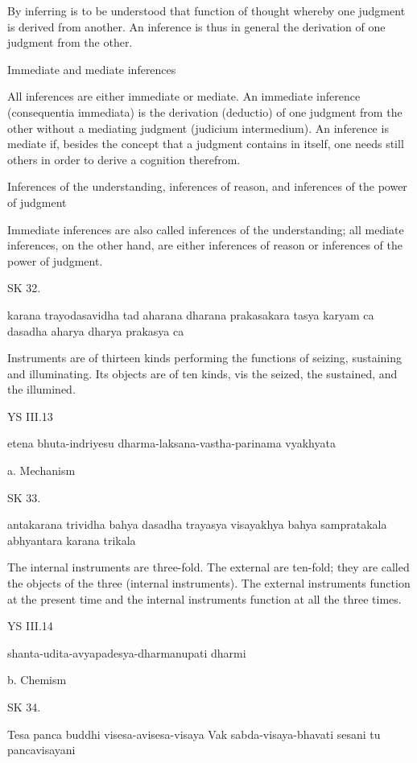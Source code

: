         By inferring is to be understood that function of thought
        whereby one judgment is derived from another.
        An inference is thus in general
        the derivation of one judgment from the other.

    Immediate and mediate inferences

        All inferences are either immediate or mediate.
        An immediate inference (consequentia immediata) is
        the derivation (deductio) of one judgment from the other
        without a mediating judgment (judicium intermedium).
        An inference is mediate if, besides the concept
        that a judgment contains in itself,
        one needs still others in order to
        derive a cognition therefrom.

    Inferences of the understanding, inferences of reason,
    and inferences of the power of judgment

        Immediate inferences are also called
        inferences of the understanding;
        all mediate inferences, on the other hand,
        are either inferences of reason
        or inferences of the power of judgment.

SK 32.

karana trayodasavidha tad aharana dharana prakasakara
tasya karyam ca dasadha aharya dharya prakasya ca

Instruments are of thirteen kinds performing the functions of
seizing, sustaining and illuminating.
Its objects are of ten kinds, vis
the seized, the sustained, and the illumined.

YS III.13

    etena bhuta-indriyesu dharma-laksana-vastha-parinama vyakhyata

    a. Mechanism

SK 33.

antakarana trividha bahya dasadha trayasya visayakhya
bahya sampratakala abhyantara karana trikala

The internal instruments are three-fold.
The external are ten-fold;
they are called the objects of the three (internal instruments).
The external instruments function at the present time and
the internal instruments function at all the three times.

YS III.14

    shanta-udita-avyapadesya-dharmanupati dharmi

    b. Chemism

SK 34.

Tesa panca buddhi visesa-avisesa-visaya
Vak sabda-visaya-bhavati sesani tu pancavisayani

